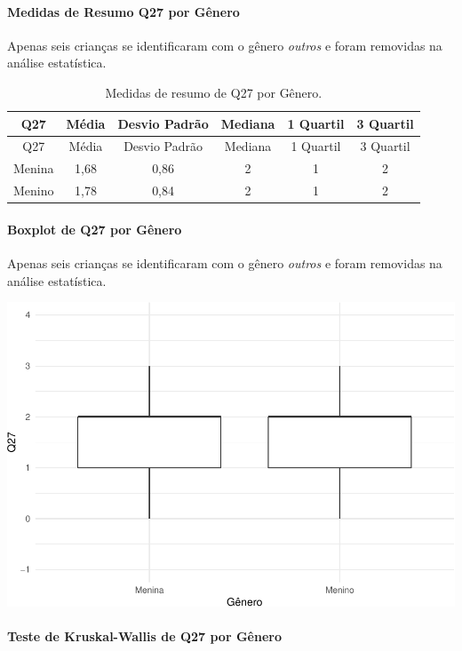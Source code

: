 \documentclass[]{article}
\let\oldparagraph\paragraph
\renewcommand{\paragraph}[1]{\oldparagraph{#1}\mbox{}}
\begin{document}
\hypertarget{medidas-de-resumo-q27-por-guxeanero}{%
\paragraph{Medidas de Resumo Q27 por Gênero}\label{medidas-de-resumo-q27-por-guxeanero}}

Apenas seis crianças se identificaram com o gênero \emph{outros} e foram removidas na análise estatística.

\begin{longtable}[]{@{}cccccc@{}}
\caption{\label{tab:unnamed-chunk-793}Medidas de resumo de Q27 por Gênero.}\tabularnewline
\toprule
Q27 & Média & Desvio Padrão & Mediana & 1 Quartil & 3 Quartil\tabularnewline
\midrule
\endfirsthead
\toprule
Q27 & Média & Desvio Padrão & Mediana & 1 Quartil & 3 Quartil\tabularnewline
\midrule
\endhead
Menina & 1,68 & 0,86 & 2 & 1 & 2\tabularnewline
Menino & 1,78 & 0,84 & 2 & 1 & 2\tabularnewline
\bottomrule
\end{longtable}

\hypertarget{boxplot-de-q27-por-guxeanero}{%
\paragraph{Boxplot de Q27 por Gênero}\label{boxplot-de-q27-por-guxeanero}}

Apenas seis crianças se identificaram com o gênero \emph{outros} e foram removidas na análise estatística.

\begin{center}\includegraphics[width=0.75\linewidth]{relatorio_covid19_files/figure-latex/unnamed-chunk-794-1} \end{center}

\hypertarget{teste-de-kruskal-wallis-de-q27-por-guxeanero}{%
\paragraph{Teste de Kruskal-Wallis de Q27 por Gênero}\label{teste-de-kruskal-wallis-de-q27-por-guxeanero}}
\end{document}

